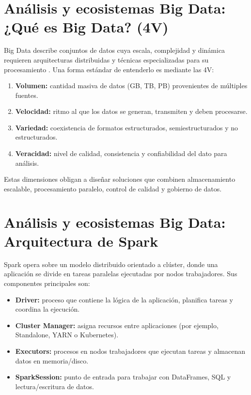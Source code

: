 \documentclass[12pt]{article}
\begin{document}
\section{Análisis y ecosistemas Big Data: ¿Qué es Big Data? (4V)}
Big Data describe conjuntos de datos cuya escala, complejidad y dinámica requieren arquitecturas distribuidas y técnicas especializadas para su procesamiento \cite{laney_3v}. Una forma estándar de entenderlo es mediante las 4V:

\begin{enumerate}[label=\textbf{V\arabic*.}, leftmargin=*]
\item \textbf{Volumen:} cantidad masiva de datos (GB, TB, PB) provenientes de múltiples fuentes.
\item \textbf{Velocidad:} ritmo al que los datos se generan, transmiten y deben procesarse.
\item \textbf{Variedad:} coexistencia de formatos estructurados, semiestructurados y no estructurados.
\item \textbf{Veracidad:} nivel de calidad, consistencia y confiabilidad del dato para análisis.
\end{enumerate}

Estas dimensiones obligan a diseñar soluciones que combinen almacenamiento escalable, procesamiento paralelo, control de calidad y gobierno de datos.

\section{Análisis y ecosistemas Big Data: Arquitectura de Spark}
Spark opera sobre un modelo distribuido orientado a clúster, donde una aplicación se divide en tareas paralelas ejecutadas por nodos trabajadores. Sus componentes principales son:

\begin{itemize}[leftmargin=*]
\item \textbf{Driver:} proceso que contiene la lógica de la aplicación, planifica tareas y coordina la ejecución.
\item \textbf{Cluster Manager:} asigna recursos entre aplicaciones (por ejemplo, Standalone, YARN o Kubernetes).
\item \textbf{Executors:} procesos en nodos trabajadores que ejecutan tareas y almacenan datos en memoria/disco.
\item \textbf{SparkSession:} punto de entrada para trabajar con DataFrames, SQL y lectura/escritura de datos.
\end{itemize}
\end{document}
